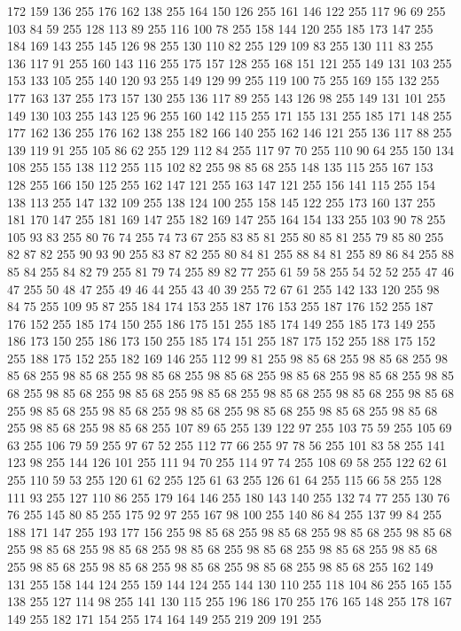 172 159 136 255 176 162 138 255 164 150 126 255 161 146 122 255 117 96 69 255 103 84 59 255 128 113 89 255 116 100 78 255 158 144 120 255 185 173 147 255 184 169 143 255 145 126 98 255 130 110 82 255 129 109 83 255 130 111 83 255 136 117 91 255 160 143 116 255 175 157 128 255 168 151 121 255 149 131 103 255 153 133 105 255 140 120 93 255 149 129 99 255 119 100 75 255 169 155 132 255 177 163 137 255 173 157 130 255 136 117 89 255 143 126 98 255 149 131 101 255 149 130 103 255 143 125 96 255 160 142 115 255 171 155 131 255 185 171 148 255 177 162 136 255 176 162 138 255 182 166 140 255 162 146 121 255 136 117 88 255 139 119 91 255 105 86 62 255 129 112 84 255 117 97 70 255 110 90 64 255 150 134 108 255 155 138 112 255 115 102 82 255 98 85 68 255 148 135 115 255 167 153 128 255 166 150 125 255 162 147 121 255 163 147 121 255 156 141 115 255 154 138 113 255 147 132 109 255 138 124 100 255 158 145 122 255 173 160 137 255 181 170 147 255 181 169 147 255 182 169 147 255 164 154 133 255
103 90 78 255 105 93 83 255 80 76 74 255 74 73 67 255 83 85 81 255 80 85 81 255 79 85 80 255 82 87 82 255 90 93 90 255 83 87 82 255 80 84 81 255 88 84 81 255 89 86 84 255 88 85 84 255 84 82 79 255 81 79 74 255 89 82 77 255 61 59 58 255 54 52 52 255 47 46 47 255 50 48 47 255 49 46 44 255 43 40 39 255 72 67 61 255 142 133 120 255 98 84 75 255 109 95 87 255 184 174 153 255 187 176 153 255 187 176 152 255 187 176 152 255 185 174 150 255 186 175 151 255 185 174 149 255 185 173 149 255 186 173 150 255 186 173 150 255 185 174 151 255 187 175 152 255 188 175 152 255 188 175 152 255 182 169 146 255 112 99 81 255 98 85 68 255 98 85 68 255 98 85 68 255 98 85 68 255 98 85 68 255 98 85 68 255 98 85 68 255 98 85 68 255 98 85 68 255 98 85 68 255 98 85 68 255 98 85 68 255 98 85 68 255 98 85 68 255 98 85 68 255 98 85 68 255 98 85 68 255 98 85 68 255 98 85 68 255 98 85 68 255 98 85 68 255
98 85 68 255 98 85 68 255 107 89 65 255 139 122 97 255 103 75 59 255 105 69 63 255 106 79 59 255 97 67 52 255 112 77 66 255 97 78 56 255 101 83 58 255 141 123 98 255 144 126 101 255 111 94 70 255 114 97 74 255 108 69 58 255 122 62 61 255 110 59 53 255 120 61 62 255 125 61 63 255 126 61 64 255 115 66 58 255 128 111 93 255 127 110 86 255 179 164 146 255 180 143 140 255 132 74 77 255 130 76 76 255 145 80 85 255 175 92 97 255 167 98 100 255 140 86 84 255 137 99 84 255 188 171 147 255 193 177 156 255 98 85 68 255 98 85 68 255 98 85 68 255 98 85 68 255 98 85 68 255 98 85 68 255 98 85 68 255 98 85 68 255 98 85 68 255 98 85 68 255 98 85 68 255 98 85 68 255 98 85 68 255 98 85 68 255 98 85 68 255 162 149 131 255 158 144 124 255 159 144 124 255 144 130 110 255 118 104 86 255 165 155 138 255 127 114 98 255 141 130 115 255 196 186 170 255 176 165 148 255 178 167 149 255 182 171 154 255 174 164 149 255 219 209 191 255
